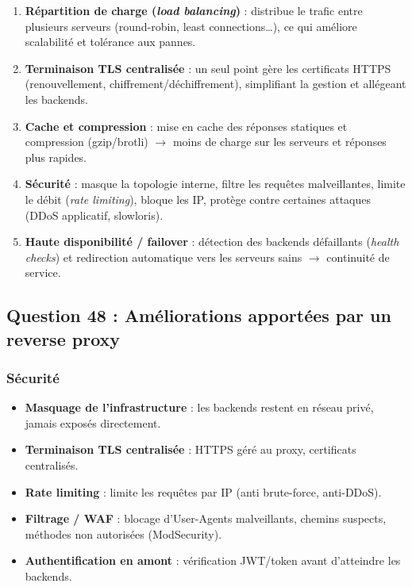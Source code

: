 \documentclass[12pt,a4paper]{article}
\begin{document}
\begin{enumerate}
  \item \textbf{R\'epartition de charge (\textit{load balancing})} : distribue le trafic entre plusieurs serveurs (round-robin, least connections\ldots), ce qui am\'eliore scalabilit\'e et tol\'erance aux pannes.
  \item \textbf{Terminaison TLS centralis\'ee} : un seul point g\`ere les certificats HTTPS (renouvellement, chiffrement/d\'echiffrement), simplifiant la gestion et all\'egeant les backends.
  \item \textbf{Cache et compression} : mise en cache des r\'eponses statiques et compression (gzip/brotli) $\rightarrow$ moins de charge sur les serveurs et r\'eponses plus rapides.
  \item \textbf{S\'ecurit\'e} : masque la topologie interne, filtre les requ\^etes malveillantes, limite le d\'ebit (\textit{rate limiting}), bloque les IP, prot\`ege contre certaines attaques (DDoS applicatif, slowloris).
  \item \textbf{Haute disponibilit\'e / failover} : d\'etection des backends d\'efaillants (\textit{health checks}) et redirection automatique vers les serveurs sains $\rightarrow$ continuit\'e de service.
\end{enumerate}

\subsection*{Question 48 : Am\'eliorations apport\'ees par un reverse proxy}

\subsubsection*{S\'ecurit\'e}
\begin{itemize}
  \item \textbf{Masquage de l'infrastructure} : les backends restent en r\'eseau priv\'e, jamais expos\'es directement.
  \item \textbf{Terminaison TLS centralis\'ee} : HTTPS g\'er\'e au proxy, certificats centralis\'es.
  \item \textbf{Rate limiting} : limite les requ\^etes par IP (anti brute-force, anti-DDoS).
  \item \textbf{Filtrage / WAF} : blocage d'User-Agents malveillants, chemins suspects, m\'ethodes non autoris\'ees (ModSecurity).
  \item \textbf{Authentification en amont} : v\'erification JWT/token avant d'atteindre les backends.
\end{itemize}
\end{document}
